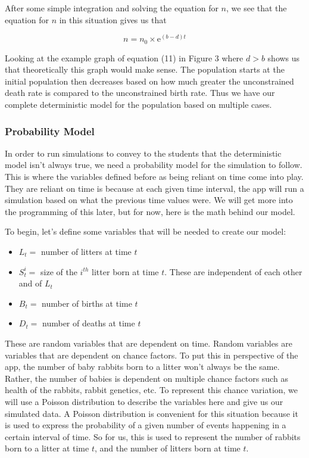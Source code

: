 \documentclass[titlepage]{article}\usepackage[]{graphicx}\usepackage[]{color}
\begin{document}
\noindent After some simple integration and solving the equation for \(n\), we see that the equation for \(n\) in this situation gives us that 

\begin{equation}
n = n_0 \times \mathrm{e}^{(b-d)t}
\end{equation}

Looking at the example graph of equation (11) in Figure 3 where \(d > b\) shows us that theoretically this graph would make sense. The population starts at the initial population then decreases based on how much greater the unconstrained death rate is compared to the unconstrained birth rate. Thus we have our complete deterministic model for the population based on multiple cases. 






\subsubsection{Probability Model}

In order to run simulations to convey to the students that the deterministic model isn't always true, we need a probability model for the simulation to follow. This is where the variables defined before as being reliant on time come into play. They are reliant on time is because at each given time interval, the app will run a simulation based on what the previous time values were. We will get more into the programming of this later, but for now, here is the math behind our model.

To begin, let's define some variables that will be needed to create our model:

\begin{itemize}

\item \(L_t =\) number of litters at time \(t\)

\item \(S_t^i =\) size of the \(i^{th}\) litter born at time \(t\). These are independent of each other and of \(L_t\)

\item \(B_t =\) number of births at time \(t\)

\item \(D_t =\) number of deaths at time \(t\)

\end{itemize}

\noindent These are random variables that are dependent on time. Random variables are variables that are dependent on chance factors. To put this in perspective of the app, the number of baby rabbits born to a litter won't always be the same. Rather, the number of babies is dependent on multiple chance factors such as health of the rabbits, rabbit genetics, etc. To represent this chance variation, we will use a Poisson distribution to describe the variables here and give us our simulated data. A Poisson distribution is convenient for this situation because it is used to express the probability of a given number of events happening in a certain interval of time. So for us, this is used to represent the number of rabbits born to a litter at time \(t\), and the number of litters born at time \(t\). 
\end{document}
